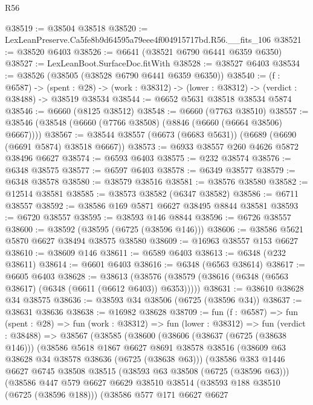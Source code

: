 \begin{lexlean}{R56}
\begin{coremodule}
@38519 := @38504 @38518
@38520 := LexLeanPreserve.Ca5fe8b9d64595a79eee4f004915717bd.R56.__fits_106
@38521 := @38520 @6403
@38526 := @6641 (@38521 @6790 @6441 @6359 @6350)
@38527 := LexLeanBoot.SurfaceDoc.fitWith
@38528 := @38527 @6403
@38534 := @38526 (@38505 (@38528 @6790 @6441 @6359 @6350))
@38540 := (f : @6587) ->
  (spent : @28) -> (work : @38312) -> (lower : @38312) -> (verdict : @38488) -> @38519 @38534
@38544 := @6652 @5631 @38518 @38534 @5874
@38546 := @6660 (@8125 @38512)
@38548 := @6660 (@7763 @38510)
@38557 := @38546 (@38548 (@6660 (@7766 @38508) (@8846 (@6660 (@6664 @38506) @6667))))
@38567 := @38544 @38557 (@6673 (@6683 @5631)) (@6689 (@6690 (@6691 @5874) @38518 @6667))
@38573 := @6933 @38557 @260 @4626 @5872 @38496 @6627
@38574 := @6593 @6403
@38575 := @232 @38574
@38576 := @6348 @38575
@38577 := @6597 @6403
@38578 := @6349 @38577
@38579 := @6348 @38578
@38580 := @38579 @38516
@38581 := @38576 @38580
@38582 := @12514 @38581
@38585 := @38573 @38582 (@6347 @38582)
@38586 := @6711 @38557
@38592 := @38586 @169 @5871 @6627 @38495 @8844 @38581
@38593 := @6720 @38557
@38595 := @38593 @146 @8844
@38596 := @6726 @38557
@38600 := @38592 (@38595 (@6725 (@38596 @146)))
@38606 := @38586 @5621 @5870 @6627 @38494 @38575 @38580
@38609 := @16963 @38557 @153 @6627
@38610 := @38609 @146
@38611 := @6589 @6403
@38613 := @6348 (@232 @38611)
@38614 := @6601 @6403
@38616 := @6348 (@6563 @38614)
@38617 := @6605 @6403
@38628 := @38613
    (@38576 (@38579 (@38616 (@6348 (@6563 @38617) (@6348 (@6611 (@6612 @6403)) @6353)))))
@38631 := @38610 @38628 @34 @38575
@38636 := @38593 @34 @38506 (@6725 (@38596 @34))
@38637 := @38631 @38636
@38638 := @16982 @38628
@38709 := fun (f : @6587) =>
  fun (spent : @28) =>
  fun (work : @38312) =>
  fun (lower : @38312) =>
  fun (verdict : @38488) =>
  @38567
    (@38585
      (@38600
        (@38606
          (@38637 (@6725 (@38638 @146)))
          (@38586
            @5618
            @1867
            @6627
            @8691
            @38578
            @38516
            (@38609 @63 @38628 @34 @38578 @38636 (@6725 (@38638 @63)))
            (@38586
              @383
              @1446
              @6627
              @6745
              @38508
              @38515
              (@38593 @63 @38508 (@6725 (@38596 @63)))
              (@38586
                @447
                @579
                @6627
                @6629
                @38510
                @38514
                (@38593 @188 @38510 (@6725 (@38596 @188)))
                (@38586
                  @577
                  @171
                  @6627
                  @6627

\end{coremodule}
\end{lexlean}
